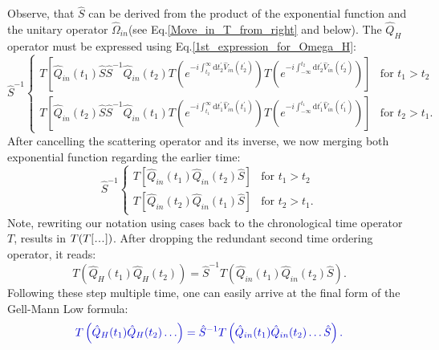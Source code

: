 \documentclass[12pt, titlepage]{article}
\newcommand\mydots{\makebox[1em][c]{.\hfil.\hfil.}}
\begin{document}
Observe, that $ \hat{S} $ can be derived from the product of the exponential function and the unitary operator $ \hat{\Omega}_{in} $(see Eq.\enskip\eqref{Move_in_T_from_right} and below). The $ \hat{Q}_{H}$ operator must be expressed using Eq.\enskip\eqref{1st_expression_for_Omega_H}:
\begin{equation}
\hat{S}^{-1}
\begin{cases}
T\left[
	\hat{Q}_{in}(t_{1})\hat{S} \hat{S}^{-1}
	\hat{Q}_{in}(t_{2})
 	T\left( 
 		e^{-i\int_{t_{2}}^{\infty}\mathrm{d}t_{2}^{\prime} \hat{V}_{in}(t_{2}^{\prime})}
	\right)
 	T\left( 
 		e^{-i\int_{-\infty}^{t_{2}}\mathrm{d}t_{2}^{\prime} \hat{V}_{in}(t_{2}^{\prime})}
 	\right)
\right]
				& \text{for $t_1 > t_2$}
		\\
T\left[
	\hat{Q}_{in}(t_{2})\hat{S} \hat{S}^{-1}
	\hat{Q}_{in}(t_{1})
 	T\left( 
 		e^{-i\int_{t_{1}}^{\infty}\mathrm{d}t_{1}^{\prime} \hat{V}_{in}(t_{1}^{\prime})}
	\right)
 	T\left( 
 		e^{-i\int_{-\infty}^{t_{1}}\mathrm{d}t_{1}^{\prime} \hat{V}_{in}(t_{1}^{\prime})}
 	\right)
\right]
      & \text{for $t_2 > t_1$}.
    \end{cases}   
\end{equation}
After cancelling the scattering operator and its inverse, we now merging both exponential function regarding the earlier time:
\begin{equation}
\hat{S}^{-1}
\begin{cases}
T\left[
	\hat{Q}_{in}(t_{1})
	\hat{Q}_{in}(t_{2})
	\hat{S}
\right]
				& \text{for $t_1 > t_2$}
		\\
T\left[
	\hat{Q}_{in}(t_{2})
	\hat{Q}_{in}(t_{1})
	\hat{S}
\right]
      & \text{for $t_2 > t_1$}.
    \end{cases}   
\end{equation}
Note, rewriting our notation using cases back to the chronological time operator $ T $, results in $ T(T[\mydots]) $. After dropping the redundant second time ordering operator, it reads:
\begin{equation}\label{Gell-Mann_Low_formula_for_2}
T\left( 
\hat{Q}_{H}(t_1)
\hat{Q}_{H}(t_2)
\right) 
=
\hat{S}^{-1}
T\left( 
\hat{Q}_{in}(t_{1})
\hat{Q}_{in}(t_{2})
\hat{S}
\right).
\end{equation}
Following these step multiple time, one can easily  arrive at the final form of the Gell-Mann Low formula:
\begin{equation}\label{Gell-Mann_Low_formula}
\textcolor[RGB]{0,0,204}{
T\left( 
\hat{Q}_{H}(t_1)
\hat{Q}_{H}(t_2)
\ldots
\right) 
=
\hat{S}^{-1}
T\left( 
\hat{Q}_{in}(t_{1})
\hat{Q}_{in}(t_{2})
\ldots
\hat{S}
\right).
}
\end{equation}
\end{document}
